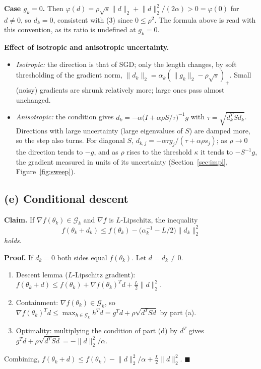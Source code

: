 \documentclass[11pt,a4paper]{article}
\newcommand{\G}{\mathcal{G}_k}
\newcommand{\norm}[1]{\lVert #1\rVert_2}
\begin{document}
\textbf{Case $g_k=0$.} Then $\varphi(d)=\rho\sqrt s\norm d+\norm d^2/(2\alpha)>0=\varphi(0)$ for
$d\ne0$, so $d_k=0$, consistent with (3) since $0\le\rho^2$. The formula above is read with this
convention, as its ratio is undefined at $g_k=0$.

\textbf{Effect of isotropic and anisotropic uncertainty.}
\begin{itemize}
\item \emph{Isotropic:} the direction is that of SGD; only the length changes, by soft
thresholding of the gradient norm, $\norm{d_k}=\alpha_k(\norm{g_k}-\rho\sqrt s)_+$. Small (noisy)
gradients are shrunk relatively more; large ones pass almost unchanged.
\item \emph{Anisotropic:} the condition gives
$d_k=-\alpha\big(I+\alpha\rho S/\tau\big)^{-1}g$ with $\tau=\sqrt{d_k^TSd_k}$. Directions with
large uncertainty (large eigenvalues of $S$) are damped more, so the step also turns. For
diagonal $S$, $d_{k,j}=-\alpha\tau g_j/(\tau+\alpha\rho s_j)$; as $\rho\to0$ the direction tends to
$-g$, and as $\rho$ rises to the threshold $\kappa$ it tends to $-S^{-1}g$, the gradient measured
in units of its uncertainty (Section~\ref{sec:impl}, Figure~\ref{fig:sweep}).
\end{itemize}

\subsection{(e) Conditional descent}

\textbf{Claim.} If $\nabla f(\theta_k)\in\G$ and $\nabla f$ is $L$-Lipschitz, the inequality
\begin{equation*}
f(\theta_k+d_k)\le f(\theta_k)-\big(\alpha_k^{-1}-L/2\big)\norm{d_k}^2
\end{equation*}
\emph{holds}.

\textbf{Proof.} If $d_k=0$ both sides equal $f(\theta_k)$. Let $d=d_k\ne0$.
\begin{enumerate}
\item Descent lemma ($L$-Lipschitz gradient):
$f(\theta_k+d)\le f(\theta_k)+\nabla f(\theta_k)^Td+\tfrac L2\norm d^2$.
\item Containment: $\nabla f(\theta_k)\in\G$, so
$\nabla f(\theta_k)^Td\le\max_{h\in\G}h^Td=g^Td+\rho\sqrt{d^TSd}$ by part (a).
\item Optimality: multiplying the condition of part (d) by $d^T$ gives
$g^Td+\rho\sqrt{d^TSd}=-\norm d^2/\alpha$.
\end{enumerate}
Combining, $f(\theta_k+d)\le f(\theta_k)-\norm d^2/\alpha+\tfrac L2\norm d^2$.
\hfill$\blacksquare$
\end{document}
